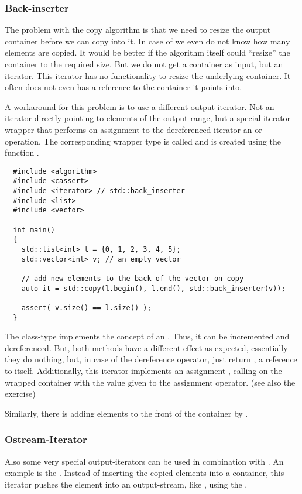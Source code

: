 \subsubsection{Back-inserter}
The problem with the copy algorithm is that we need to resize the output container before we can copy into it. In case of  we even do
not know how many elements are copied. It would be better if the algorithm itself could ``resize'' the container to the required size. But we
do not get a container as input, but an iterator. This iterator has no functionality to resize the underlying container. It often does not even has
a reference to the container it points into.

A workaround for this problem is to use a different output-iterator. Not an iterator directly pointing to elements of the output-range, but a special
iterator wrapper that performs on assignment to the dereferenced iterator an  or  operation. The corresponding
wrapper type is called  and is created using the function .
%
\begin{verbatim}
  #include <algorithm>
  #include <cassert>
  #include <iterator> // std::back_inserter
  #include <list>
  #include <vector>

  int main()
  {
    std::list<int> l = {0, 1, 2, 3, 4, 5};
    std::vector<int> v; // an empty vector

    // add new elements to the back of the vector on copy
    auto it = std::copy(l.begin(), l.end(), std::back_inserter(v));

    assert( v.size() == l.size() );
  }
\end{verbatim}

The class-type  implements the concept of an . Thus, it can be incremented and dereferenced. But, both
methods have a different effect as expected, essentially they do nothing, but, in case of the dereference operator, just return , \ie a reference
to itself. Additionally, this iterator implements an assignment , calling  on the wrapped container with the
value given to the assignment operator. (see also the exercise)

Similarly, there is  adding elements to the front of the container by .


\subsubsection{Ostream-Iterator}
Also some very special output-iterators can be used in combination with . An example is the . Instead of
inserting the copied elements into a container, this iterator pushes the element into an output-stream, like , using the .

